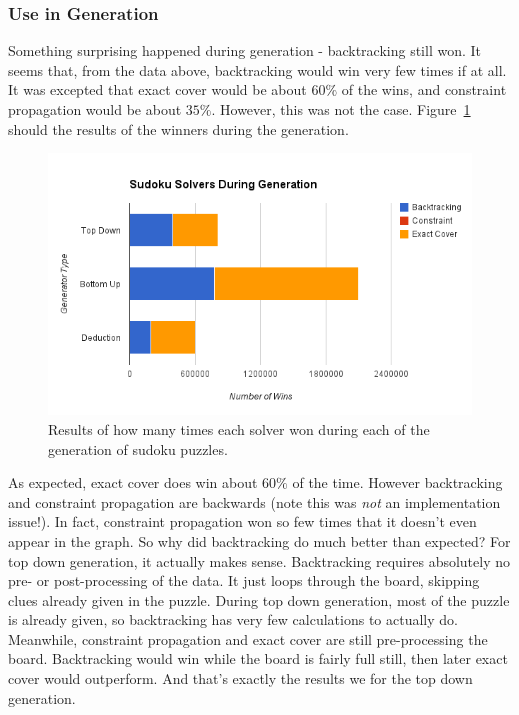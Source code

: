     \subsubsection{Use in Generation}
    Something surprising happened during generation - backtracking still won. It seems that, from the data above, backtracking would
    win very few times if at all. It was excepted that exact cover would be about $60\%$ of the wins, and constraint propagation would
    be about $35\%$. However, this was not the case. Figure~\ref{fig:solvergen} should the results of the winners during the generation.
    \begin{figure}[H]
        \centering
        \includegraphics[scale=0.70]{solvers.png}
        \caption{Results of how many times each solver won during each of the generation of sudoku puzzles.}
        \label{fig:solvergen}
    \end{figure}
    As expected, exact cover does win about $60\%$ of the time. However backtracking and constraint propagation are backwards (note this
    was \textit{not} an implementation issue!). In fact, constraint propagation won so few times that it doesn't even appear in the graph.
    So why did backtracking do much better than expected? For top down generation, it actually makes sense. Backtracking requires absolutely
    no pre- or post-processing of the data. It just loops through the board, skipping clues already given in the puzzle. During top down generation,
    most of the puzzle is already given, so backtracking has very few calculations to actually do. Meanwhile, constraint propagation and exact
    cover are still pre-processing the board. Backtracking would win while the board is fairly full still, then later exact cover would outperform.
    And that's exactly the results we for the top down generation.\\

